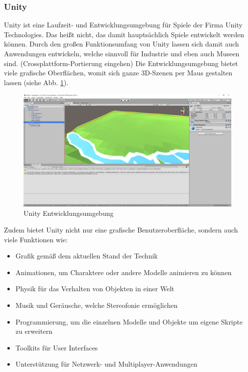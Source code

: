 \documentclass[a4paper,12pt,oneside]{article}
\begin{document}
      \subsubsection{Unity}
        Unity ist eine Laufzeit- und Entwicklungsumgebung für Spiele der Firma Unity
        Technologies. Das heißt nicht, das damit hauptsächlich Spiele entwickelt werden
        können. Durch den großen Funktionsumfang von Unity lassen sich damit auch
        Anwendungen entwickeln, welche sinnvoll für Industrie und eben auch Museen sind.
        (Crossplattform-Portierung eingehen)
        Die Entwicklungsumgebung bietet viele grafische Oberflächen, womit sich ganze
        3D-Szenen per Maus gestalten lassen (siehe Abb. \ref{fig:unity1}). 
        \begin{figure}[t]
          \centering
          \includegraphics[scale=0.3]{img/unity1.png}
          \caption{Unity Entwicklungsumgebung}
          \label{fig:unity1}
        \end{figure}
        Zudem bietet
        Unity nicht nur eine grafische Benutzeroberfläche, sondern auch viele Funktionen
        wie:
        \begin{itemize}
          \item Grafik gemäß dem aktuellen Stand der Technik
          \item Animationen, um Charaktere oder andere Modelle animieren zu können
          \item Physik für das Verhalten von Objekten in einer Welt
          \item Musik und Geräusche, welche Stereofonie ermöglichen
          \item Programmierung, um die einzelnen Modelle und Objekte um eigene Skripte
          zu erweitern
          \item Toolkits für User Interfaces
          \item Unterstützung für Netzwerk- und Multiplayer-Anwendungen
        \end{itemize}
\end{document}
